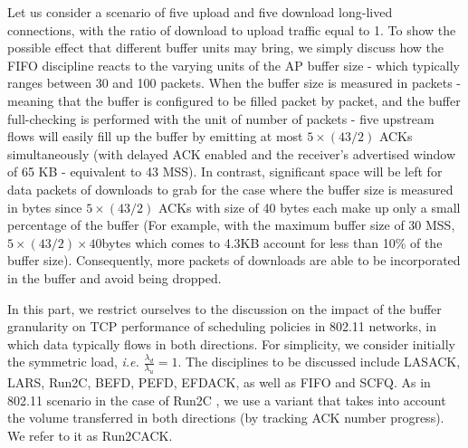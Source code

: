 \documentclass[preprint,12pt]{elsarticle}
\begin{document}
Let us consider a scenario of five upload and five download long-lived connections, with the ratio of download to upload traffic equal to 1. To show the possible effect that different buffer units may bring, we simply discuss how the FIFO discipline reacts to the varying units of the AP buffer size - which typically ranges between 30 and 100 packets. When the buffer size is measured in packets - meaning that the buffer is configured to be filled packet by packet, and the buffer full-checking is performed with the unit of number of packets - five upstream flows will easily fill up the buffer by emitting at most $5\times(43/2)$ ACKs simultaneously (with delayed ACK enabled and the receiver's advertised window of 65 KB - equivalent to 43 MSS). In contrast, significant space will be left for data packets of downloads to grab for the case where the buffer size is measured in bytes since $5\times(43/2)$ ACKs with size of 40 bytes each make up only a small percentage of the buffer (For example, with the maximum buffer size of 30 MSS, $5\times(43/2)\times40$bytes which comes to 4.3KB account for less than 10\% of the buffer size). Consequently, more packets of downloads are able to be incorporated in the buffer and avoid being dropped. 

In this part, we restrict ourselves to the discussion on the impact of the buffer granularity on TCP performance of scheduling policies in 802.11 networks, in which data typically flows in both directions. For simplicity, we consider initially the symmetric load, \textit{i.e.} $\frac{\lambda_{d}}{\lambda_{u}} = 1$. The disciplines to be discussed include LASACK, LARS, Run2C, BEFD, PEFD, EFDACK, as well as FIFO and SCFQ. As in 802.11 scenario in the case of Run2C \cite{Avrachenkov04Run2c}, we use a variant that takes into account the volume transferred in both directions (by tracking ACK number progress). We refer to it as Run2CACK. 

\end{document}
